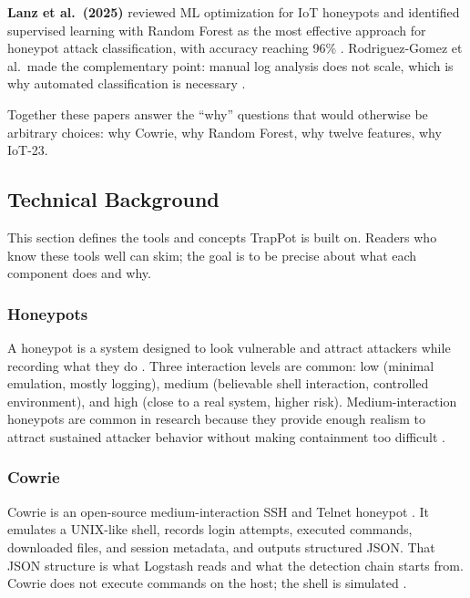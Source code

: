 \textbf{Lanz et al.\ (2025)} reviewed ML optimization for IoT honeypots and identified supervised learning with Random Forest as the most effective approach for honeypot attack classification, with accuracy reaching 96\% \cite{lanz2025optimizing}. Rodriguez-Gomez et al.\ made the complementary point: manual log analysis does not scale, which is why automated classification is necessary \cite{rodriguezgomez2025systematic}.

Together these papers answer the ``why'' questions that would otherwise be arbitrary choices: why Cowrie, why Random Forest, why twelve features, why IoT-23.

\subsection{Technical Background}
\label{sub:technical_background}

This section defines the tools and concepts TrapPot is built on. Readers who know these tools well can skim; the goal is to be precise about what each component does and why.

\subsubsection{Honeypots}
\label{subsub:honeypots}

A honeypot is a system designed to look vulnerable and attract attackers while recording what they do \cite{9268794}. Three interaction levels are common: low (minimal emulation, mostly logging), medium (believable shell interaction, controlled environment), and high (close to a real system, higher risk). Medium-interaction honeypots are common in research because they provide enough realism to attract sustained attacker behavior without making containment too difficult \cite{9268794,franco2021survey}.

\subsubsection{Cowrie}
\label{subsub:cowrie}

Cowrie is an open-source medium-interaction SSH and Telnet honeypot \cite{9071014}. It emulates a UNIX-like shell, records login attempts, executed commands, downloaded files, and session metadata, and outputs structured JSON. That JSON structure is what Logstash reads and what the detection chain starts from. Cowrie does not execute commands on the host; the shell is simulated \cite{9071014,9359711}.

